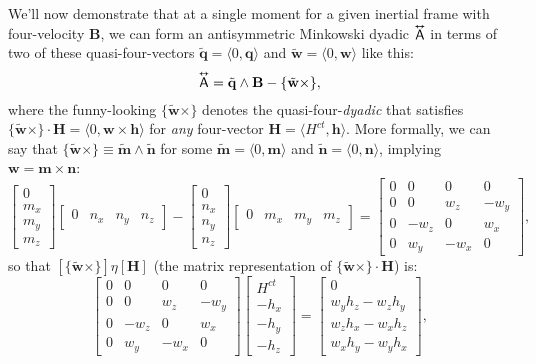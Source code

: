 \documentclass[12pt]{article}
\renewcommand{\vv}[1]{\mathbf{#1}}
\newcommand{\tightoverset}[2]{%
  \mathop{#2}\limits^{\vbox to -.5ex{\kern-0.75ex\hbox{$#1$}\vss}}}
\newcommand{\inlinedy}[1]{\tightoverset{\text{\tiny$\bm\leftrightarrow$}}{#1}}
\newcommand{\capdy}[1]{ \overset{ \text{\tiny$\bm\leftrightarrow$} }{\vphantom{\text{\small{A}}}\smash{#1}} }
\begin{document}
We'll now demonstrate that at a single moment for a given inertial frame with four-velocity $\vv B$, we can form an antisymmetric Minkowski dyadic $\inlinedy{\mathsf{A}}$ in terms of two of these quasi-four-vectors $\tilde{\vv q} = \langle 0, \vv q \rangle$ and $\tilde{\vv w} = \langle 0, \vv w \rangle$ like this:
\begin{equation*}
\capdy{\mathsf{A}} = \tilde{\vv q} \wedge \vv B - \{ \tilde{\vv w} \times \},
\end{equation*}
where the funny-looking $\{ \tilde{\vv w} \times \}$ denotes the quasi-four-\emph{dyadic} that satisfies ${ \{ \tilde{\vv w} \times \} \cdot \vv H = \langle 0, \vv w \times \vv h \rangle }$ for \emph{any} four-vector ${\vv H = \langle H^{ct}, \vv h \rangle}$. More formally, we can say that $\{ \tilde{\vv w} \times \} \equiv \tilde{\vv m} \wedge \tilde{\vv n}$ for some $\tilde{\vv m} = \langle 0, \vv m \rangle$ and $\tilde{\vv n} = \langle 0, \vv n \rangle$, implying ${ \vv w = \vv m \times \vv n }$:
\begin{equation*}
\begin{bmatrix}
0 \\
m_x \\
m_y \\
m_z
\end{bmatrix}
\begin{bmatrix}
0 & n_x & n_y & n_z
\end{bmatrix}
-
\begin{bmatrix}
0 \\
n_x \\
n_y \\
n_z
\end{bmatrix}
\begin{bmatrix}
0 & m_x & m_y & m_z
\end{bmatrix}
=
\begin{bmatrix}
0 & 0 & 0 & 0 \\
0 & 0 & w_z & -w_y \\
0 & -w_z & 0 & w_x \\
0 & w_y & -w_x & 0
\end{bmatrix},
\end{equation*}
so that $[\{ \tilde{\vv w} \times \}] \eta [\vv H]$ (the matrix representation of $\{ \tilde{\vv w} \times \} \cdot \vv H$) is:
\begin{equation*}
\begin{bmatrix}
0 & 0 & 0 & 0 \\
0 & 0 & w_z & -w_y \\
0 & -w_z & 0 & w_x \\
0 & w_y & -w_x & 0
\end{bmatrix}
\begin{bmatrix}
H^{ct} \\
- h_x \\
- h_y \\
- h_z
\end{bmatrix}
=
\begin{bmatrix}
0 \\
w_y h_z - w_z h_y \\
w_z h_x - w_x h_z \\
w_x h_y - w_y h_x
\end{bmatrix},
\end{equation*}
\end{document}
